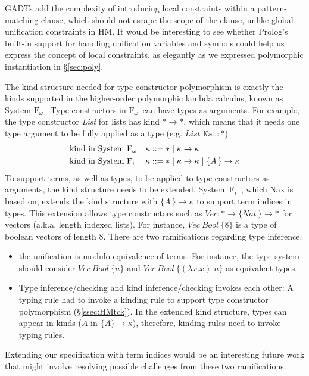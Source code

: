\documentclass[runningheads,a4paper]{llncs}
\newcommand{\Fw}{\ensuremath{\mathrm{F}_\omega}}
\newcommand{\Fi}{\ensuremath{\mathrm{F}_i}}
\begin{document}
GADTs add the complexity of introducing local constraints
within a pattern-matching clause, which should not escape
the scope of the clause, unlike global unification constraints in HM.
It would be interesting to see whether Prolog's built-in support for
handling unification variables and symbols could help us express
the concept of local constraints.
as elegantly as we expressed
polymorphic instantiation in \S\ref{sec:poly}.

The kind structure needed for type constructor polymorphism is exactly
the kinds supported in the higher-order polymorphic lambda calculus,
known as System \Fw\ %
Type constructors in \Fw\ can have types as arguments.
For example, the type constructor \textit{List}
for lists has kind $* \to *$, which means that it needs one type argument
to be fully applied as a type (e.g. $\textit{List}\,~\texttt{Nat} : *$).
\begin{align*}
  &\text{kind in System \Fw}  &&\kappa ::= * \mid \kappa \to \kappa \\
  &\text{kind in System \Fi}  &&\kappa ::= * \mid \kappa \to \kappa
                                             \mid \{A\,\}\to \kappa
\end{align*}
To support terms, as well as types, to be applied to type constructors
as arguments, the kind structure needs to be extended.
System~\Fi\ \cite{AhnSheFioPit13}, which Nax is based on, extends
the kind structure with $\{A\,\}\to \kappa$ to support term indices in types.
This extension allows type constructors 
such as $\textit{Vec} : * \to \{\textit{Nat}\,\} \to *$ for vectors
(a.k.a. length indexed lists). For instance,
$\textit{Vec}~\textit{Bool}~\{8\}$ is a type of boolean vectors of length 8.
There are two ramifications regarding type inference:
\begin{itemize}\vspace*{-.75ex}
\item the unification is modulo equivalence of terms: For instance,
  the type system should consider $\textit{Vec}~\textit{Bool}~\{n\}$ and
  $\textit{Vec}~\textit{Bool}~\{(\lambda x.x)\;n\}$ as equivalent types.
  \vspace*{.5ex}
\item Type inference/checking and kind inference/checking invokes each other:
  A typing rule had to invoke a kinding rule to support
  type constructor polymorphism  (\S\ref{ssec:HMtck}).
  In the extended kind structure, types can appear in kinds
  ($A$ in $\{\!A\}\to\kappa$), therefore, kinding rules
  need to invoke typing rules.
\end{itemize}
Extending our specification with term indices would be
an interesting future work that might involve resolving possible challenges
from these two ramifications.
\end{document}
